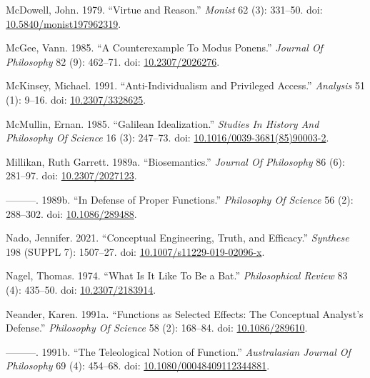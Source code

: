 \documentclass[
  10pt,
  letterpaper,
  DIV=11,
  numbers=noendperiod,
  twoside]{scrartcl}
\newlength{\cslhangindent}
\newenvironment{CSLReferences}[2] %
 {\begin{list}{}{%
  \setlength{\itemindent}{0pt}
  \setlength{\leftmargin}{0pt}
  \setlength{\parsep}{0pt}
  \ifodd #1
   \setlength{\leftmargin}{\cslhangindent}
   \setlength{\itemindent}{-1\cslhangindent}
  \fi
  \setlength{\itemsep}{#2\baselineskip}}}
 {\end{list}}
\begin{document}
\begin{CSLReferences}{1}{0}
McDowell, John. 1979. {``Virtue and Reason.''} \emph{Monist} 62 (3):
331--50. doi:
\href{https://doi.org/10.5840/monist197962319}{10.5840/monist197962319}.

McGee, Vann. 1985. {``A Counterexample To Modus Ponens.''} \emph{Journal
Of Philosophy} 82 (9): 462--71. doi:
\href{https://doi.org/10.2307/2026276}{10.2307/2026276}.

McKinsey, Michael. 1991. {``Anti-Individualism and Privileged Access.''}
\emph{Analysis} 51 (1): 9--16. doi:
\href{https://doi.org/10.2307/3328625}{10.2307/3328625}.

McMullin, Ernan. 1985. {``Galilean Idealization.''} \emph{Studies In
History And Philosophy Of Science} 16 (3): 247--73. doi:
\href{https://doi.org/10.1016/0039-3681(85)90003-2}{10.1016/0039-3681(85)90003-2}.

Millikan, Ruth Garrett. 1989a. {``Biosemantics.''} \emph{Journal Of
Philosophy} 86 (6): 281--97. doi:
\href{https://doi.org/10.2307/2027123}{10.2307/2027123}.

---------. 1989b. {``In Defense of Proper Functions.''} \emph{Philosophy
Of Science} 56 (2): 288--302. doi:
\href{https://doi.org/10.1086/289488}{10.1086/289488}.

Nado, Jennifer. 2021. {``Conceptual Engineering, Truth, and Efficacy.''}
\emph{Synthese} 198 (SUPPL 7): 1507--27. doi:
\href{https://doi.org/10.1007/s11229-019-02096-x}{10.1007/s11229-019-02096-x}.

Nagel, Thomas. 1974. {``What Is It Like To Be a Bat.''}
\emph{Philosophical Review} 83 (4): 435--50. doi:
\href{https://doi.org/10.2307/2183914}{10.2307/2183914}.

Neander, Karen. 1991a. {``Functions as Selected Effects: The Conceptual
Analyst's Defense.''} \emph{Philosophy Of Science} 58 (2): 168--84. doi:
\href{https://doi.org/10.1086/289610}{10.1086/289610}.

---------. 1991b. {``The Teleological Notion of Function.''}
\emph{Australasian Journal Of Philosophy} 69 (4): 454--68. doi:
\href{https://doi.org/10.1080/00048409112344881}{10.1080/00048409112344881}.


\end{CSLReferences}
\end{document}
